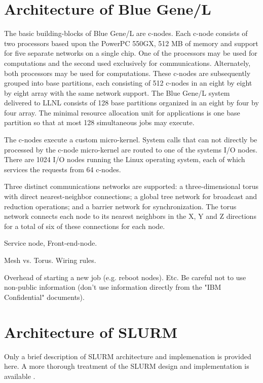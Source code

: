 \documentclass[10pt,onecolumn,times]{../common/llncs}
\begin{document}
{\section{Architecture of Blue Gene/L}

The basic building-blocks of Blue Gene/L are c-nodes. 
Each c-node consists
of two processors based upon the PowerPC 550GX, 512 MB of memory 
and support for five separate networks on a single chip.
One of the processors may be used for computations and the 
second used exclusively for communications. 
Alternately, both processors may be used for computations. 
These c-nodes are subsequently grouped into base partitions, each consisting 
of 512 c-nodes in an eight by eight by eight array with the same 
network support.
The Blue Gene/L system delivered to LLNL consists of 128 base 
partitions organized in an eight by four by four array.
The minimal resource allocation unit for applications is one 
base partition so that at most 128 simultaneous jobs may execute. 

The c-nodes execute a custom micro-kernel. 
System calls that can not directly be processed by the c-node 
micro-kernel are routed to one of the systems I/O nodes. 
There are 1024 I/O nodes running the Linux operating system, 
each of which services the requests from 64 c-nodes.

Three distinct communications networks are supported: 
a three-dimensional torus with direct nearest-neighbor connections;
a global tree network for broadcast and reduction operations; and 
a barrier network for synchronization. 
The torus network connects each node to 
its nearest neighbors in the X, Y and Z directions for a 
total of six of these connections for each node. 


Service node, Front-end-node.

Mesh vs. Torus.
Wiring rules.

Overhead of starting a new job (e.g. reboot nodes).
Etc.
Be careful not to use non-public information (don't use 
information directly from the "IBM Confidential" documents).

\section{Architecture of SLURM}

Only a brief description of SLURM architecture and implemenation is provided 
here. 
A more thorough treatment of the SLURM design and implementation is 
available \cite{SLURM2002}.

}
\end{document}
